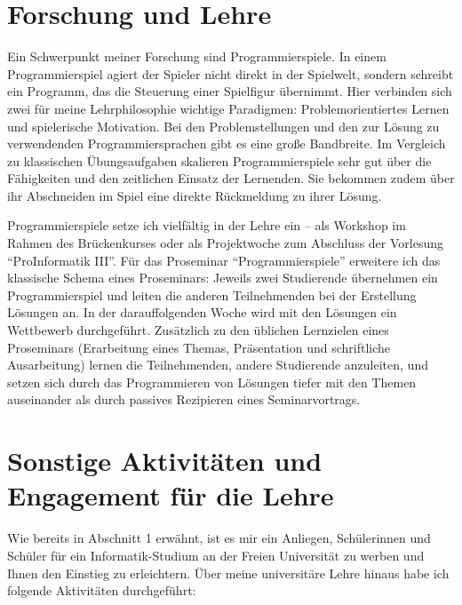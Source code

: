 \documentclass[11pt,ngerman]{article}
\begin{document}
\section{Forschung und Lehre}
Ein Schwerpunkt meiner Forschung sind Programmierspiele. In einem Programmierspiel agiert der Spieler nicht direkt in der Spielwelt, sondern schreibt ein Programm, das die Steuerung einer Spielfigur übernimmt. Hier verbinden sich zwei für meine Lehrphilosophie wichtige Paradigmen: Problemorientiertes Lernen und spielerische Motivation. Bei den Problemstellungen und den zur Lösung zu verwendenden Programmiersprachen gibt es eine große Bandbreite. Im Vergleich zu klassischen Übungsaufgaben skalieren Programmierspiele sehr gut über die Fähigkeiten und den zeitlichen Einsatz der Lernenden. Sie bekommen zudem über ihr Abschneiden im Spiel eine direkte Rückmeldung zu ihrer Lösung.

Programmierspiele setze ich vielfältig in der Lehre ein -- als Workshop im Rahmen des Brückenkurses oder als Projektwoche zum Abschluss der Vorlesung ``ProInformatik III''. Für das Proseminar ``Programmierspiele'' erweitere ich das klassische Schema eines Proseminars: Jeweils zwei Studierende übernehmen ein Programmierspiel und leiten die anderen Teilnehmenden bei der Erstellung Lösungen an. In der darauffolgenden Woche wird mit den Lösungen ein Wettbewerb durchgeführt. Zusätzlich zu den üblichen Lernzielen eines Proseminars (Erarbeitung eines Themas, Präsentation und schriftliche Ausarbeitung) lernen die Teilnehmenden, andere Studierende anzuleiten, und setzen sich durch das Programmieren von Lösungen tiefer mit den Themen auseinander als durch passives Rezipieren eines Seminarvortrags.

\section{Sonstige Aktivitäten und Engagement für die Lehre}

Wie bereits in Abschnitt 1 erwähnt, ist es mir ein Anliegen, Schülerinnen und Schüler für ein Informatik-Studium an der Freien Universität zu werben und Ihnen den Einstieg zu erleichtern. Über meine universitäre Lehre hinaus habe ich folgende Aktivitäten durchgeführt:
\end{document}
